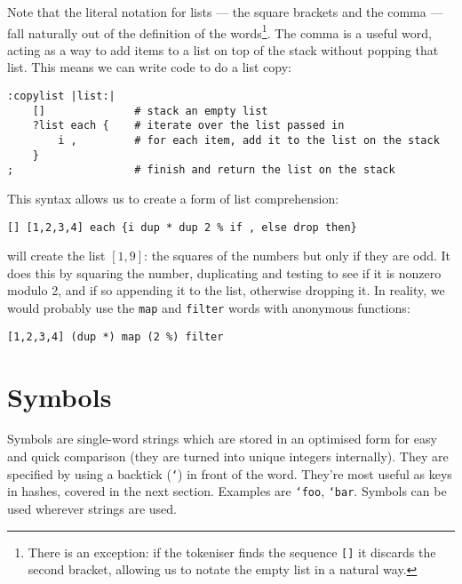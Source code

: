 Note that the literal notation for lists --- the square brackets and the
comma --- fall naturally out of the definition of the words\footnote{There
is an exception: if the tokeniser finds the sequence \texttt{[]} it discards
the second bracket, allowing us to notate the empty list in a natural way.}.
The comma
is a useful word, acting as a way to add items to a list on top of the stack
without popping that list. This means we can write code to do a list copy:
\begin{lstlisting}
:copylist |list:|
    []              # stack an empty list
    ?list each {    # iterate over the list passed in
        i ,         # for each item, add it to the list on the stack
    }
;                   # finish and return the list on the stack          
\end{lstlisting}
This syntax allows us to create a form of list comprehension:
\begin{lstlisting}
[] [1,2,3,4] each {i dup * dup 2 % if , else drop then}
\end{lstlisting}
will create the list $[1,9]$: the squares of the numbers but only 
if they are odd. It does this by squaring the number, duplicating and
testing to see if it is nonzero modulo 2, and if so appending it to the list,
otherwise dropping it. 
In reality, we would probably use the \texttt{map} and
\texttt{filter} words with anonymous functions:
\begin{lstlisting}
[1,2,3,4] (dup *) map (2 %) filter
\end{lstlisting}



\section{Symbols}
Symbols are single-word strings which are stored in an optimised form for easy
and quick comparison (they are turned into unique integers
internally). They are specified by using a backtick (\texttt{`}) in front of
the word. They're most useful as keys in hashes, covered in the next section.
Examples are \texttt{`foo}, \texttt{`bar}. Symbols can be used
wherever strings are used.

